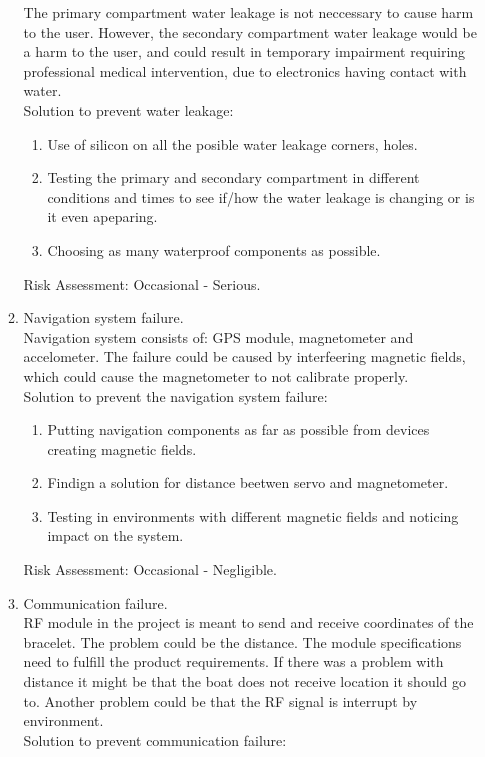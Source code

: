 \documentclass{article}[10pt]
\begin{document}
\begin{enumerate}
\begin{enumerate}
        The primary compartment water leakage is not neccessary to cause harm to the user. However, the secondary compartment water leakage would be a harm to the user,
        and could result in temporary impairment requiring professional medical intervention, due to electronics having contact with water.\\
        Solution to prevent water leakage:
        \begin{enumerate}
        \item Use of silicon on all the posible water leakage corners, holes.
        \item Testing the primary and secondary compartment in different conditions and times to see if/how the water leakage is changing or is it even apeparing.
        \item Choosing as many waterproof components as possible.
        \end{enumerate}
        Risk Assessment: Occasional - Serious.
        \item Navigation system failure.\\
        Navigation system consists of: GPS module, magnetometer and accelometer. The failure could be caused by interfeering magnetic 
        fields, which could cause the magnetometer to not calibrate properly. \\
        Solution to prevent the navigation system failure:
        \begin{enumerate}
            \item Putting navigation components as far as possible from devices creating magnetic fields.
            \item Findign a solution for distance beetwen servo and magnetometer.
            \item Testing in environments with different magnetic fields and noticing impact on the system.
        \end{enumerate}
        Risk Assessment: Occasional - Negligible.
        \item Communication failure.\\
        RF module in the project is meant to send and receive coordinates of the bracelet. The problem could be the distance. 
        The module specifications need to fulfill the product requirements. If there was a problem with distance it might be that 
        the boat does not receive location it should go to. Another problem could be that the RF signal is interrupt by environment.\\
        Solution to prevent communication failure:

\end{enumerate}
\end{enumerate}
\end{document}
